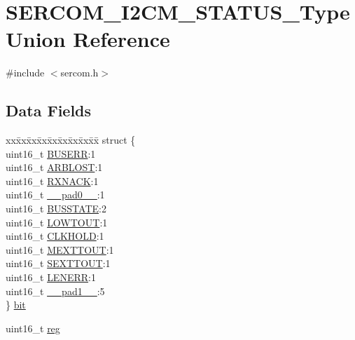 \hypertarget{union_s_e_r_c_o_m___i2_c_m___s_t_a_t_u_s___type}{}\section{S\+E\+R\+C\+O\+M\+\_\+\+I2\+C\+M\+\_\+\+S\+T\+A\+T\+U\+S\+\_\+\+Type Union Reference}
\label{union_s_e_r_c_o_m___i2_c_m___s_t_a_t_u_s___type}


{\ttfamily \#include $<$sercom.\+h$>$}

\subsection*{Data Fields}
\begin{DoxyCompactItemize}
\item 
\begin{tabbing}
xx\=xx\=xx\=xx\=xx\=xx\=xx\=xx\=xx\=\kill
struct \{\\
\>uint16\_t \mbox{\hyperlink{union_s_e_r_c_o_m___i2_c_m___s_t_a_t_u_s___type_a44b2183b4c67c3dca877a59031b8c103}{BUSERR}}:1\\
\>uint16\_t \mbox{\hyperlink{union_s_e_r_c_o_m___i2_c_m___s_t_a_t_u_s___type_a30922490bb30ce95546bbf932fb1d582}{ARBLOST}}:1\\
\>uint16\_t \mbox{\hyperlink{union_s_e_r_c_o_m___i2_c_m___s_t_a_t_u_s___type_a8f68c21e9cd41cd315423290a05d0b98}{RXNACK}}:1\\
\>uint16\_t \mbox{\hyperlink{union_s_e_r_c_o_m___i2_c_m___s_t_a_t_u_s___type_a77132c2c26a75f5b8751b235cda23828}{\_\_pad0\_\_}}:1\\
\>uint16\_t \mbox{\hyperlink{union_s_e_r_c_o_m___i2_c_m___s_t_a_t_u_s___type_a34b7926853eb9c190387fc55839a44f5}{BUSSTATE}}:2\\
\>uint16\_t \mbox{\hyperlink{union_s_e_r_c_o_m___i2_c_m___s_t_a_t_u_s___type_a38e12ce9808854d1db0794cc5599ab2f}{LOWTOUT}}:1\\
\>uint16\_t \mbox{\hyperlink{union_s_e_r_c_o_m___i2_c_m___s_t_a_t_u_s___type_a1f19f733cd52fee28607cc02957db2a5}{CLKHOLD}}:1\\
\>uint16\_t \mbox{\hyperlink{union_s_e_r_c_o_m___i2_c_m___s_t_a_t_u_s___type_af8bb662ed8224313c54141616066a150}{MEXTTOUT}}:1\\
\>uint16\_t \mbox{\hyperlink{union_s_e_r_c_o_m___i2_c_m___s_t_a_t_u_s___type_a369d5cf43d681c76345e0e85228bf532}{SEXTTOUT}}:1\\
\>uint16\_t \mbox{\hyperlink{union_s_e_r_c_o_m___i2_c_m___s_t_a_t_u_s___type_a3e058472691e5d25c5956333ac4ec28e}{LENERR}}:1\\
\>uint16\_t \mbox{\hyperlink{union_s_e_r_c_o_m___i2_c_m___s_t_a_t_u_s___type_ab72e3a1f2f7db8695c60c658f5a0f11a}{\_\_pad1\_\_}}:5\\
\} \mbox{\hyperlink{union_s_e_r_c_o_m___i2_c_m___s_t_a_t_u_s___type_a99f44315638d46d27662abf490b88e40}{bit}}\\

\end{tabbing}\item 
uint16\+\_\+t \mbox{\hyperlink{union_s_e_r_c_o_m___i2_c_m___s_t_a_t_u_s___type_a11760f5020019f4aa8cb02e694f7cc44}{reg}}
\end{DoxyCompactItemize}


